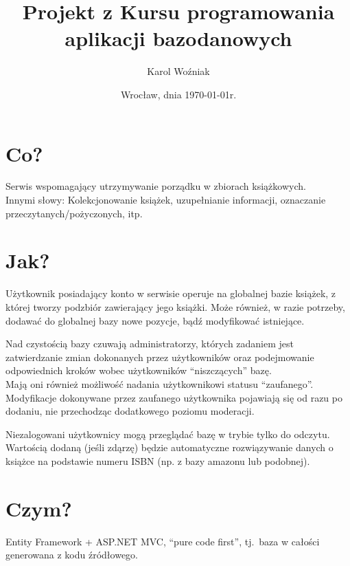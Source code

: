 \documentclass[fontsize=14pt]{scrartcl}
\title{\LARGE \textbf{{Projekt z Kursu programowania aplikacji bazodanowych}}}
\author{Karol Woźniak}
\date{Wrocław, dnia \today r.}
\begin{document}
\thispagestyle{empty}
\maketitle
\section{Co?}
Serwis wspomagający utrzymywanie porządku w zbiorach książkowych.\\
Innymi słowy: Kolekcjonowanie książek, uzupełnianie informacji, oznaczanie przeczytanych/pożyczonych, itp.
\section{Jak?}
Użytkownik posiadający konto w serwisie operuje na globalnej bazie książek, z której tworzy podzbiór zawierający jego książki. Może również, w razie potrzeby, dodawać do globalnej bazy nowe pozycje, bądź modyfikować istniejące.

Nad czystością bazy czuwają administratorzy, których zadaniem jest zatwierdzanie zmian dokonanych przez użytkowników oraz podejmowanie odpowiednich kroków wobec użytkowników ``niszczących'' bazę.\\
Mają oni również możliwość nadania użytkownikowi statusu ``zaufanego''. Modyfikacje dokonywane przez zaufanego użytkownika pojawiają się od razu po dodaniu, nie przechodząc dodatkowego poziomu moderacji.

Niezalogowani użytkownicy mogą przeglądać bazę w trybie tylko do odczytu.\\[1ex]

Wartością dodaną (jeśli zdąrzę) będzie automatyczne rozwiązywanie danych o książce na podstawie numeru ISBN (np. z bazy amazonu lub podobnej).
\section{Czym?}
Entity Framework + ASP.NET MVC, ``pure code first'', tj.\ baza w całości generowana z kodu źródłowego.
\end{document}
